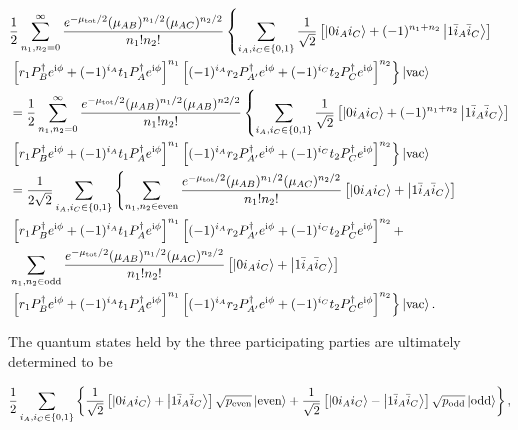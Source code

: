 \documentclass[aps,twocolumn,superscriptaddress,showpacs,nofootinbib]{revtex4-2}
\renewcommand{\i}{\mathrm{i}}
\begin{document}
\begin{widetext}
\begin{equation}
\begin{split}
&\frac{1}{2} \sum_{n_1,n_2=0}^{\infty} \frac{e^{-\mu_\text{tot}/2}(\mu_{AB})^{n_1/2}(\mu_{AC})^{n_2/2}}{n_1!n_2!}
\left\{ \sum_{i_A,i_C \in \{0,1\}} \frac{1}{\sqrt{2}}  \left[ \ket{0 i_A i_C} + (-1)^{n_1+n_2}\ket{1 \bar{i}_A \bar{i}_C} \right] \right.\\
&\left.\left[ r_1 P^\dagger_B e^{\i \phi} + (-1)^{i_A} t_1 P^\dagger_{A} e^{\i \phi} \right]^{n_1}
\left[ (-1)^{i_A} r_2 P^\dagger_{A'} e^{\i \phi} + (-1)^{i_C} t_2 P^\dagger_C e^{\i \phi} \right]^{n_2}  \right\}
\ket{\text{vac}}\\
&= \frac{1}{2} \sum_{n_1,n_2=0}^{\infty} \frac{e^{-\mu_\text{tot}/2}(\mu_{AB})^{n_1/2}(\mu_{AB})^{n2/2}}{n_1!n_2!}
\left\{ \sum_{i_A,i_C \in \{0,1\}} \frac{1}{\sqrt{2}}  \left[ \ket{0 i_A i_C} + (-1)^{n_1+n_2}\ket{1 \bar{i}_A \bar{i}_C} \right] \right.\\
&\left.\left[ r_1 P^\dagger_B e^{\i \phi} + (-1)^{i_A} t_1 P^\dagger_{A} e^{\i \phi} \right]^{n_1}
\left[ (-1)^{i_A} r_2 P^\dagger_{A'} e^{\i \phi} + (-1)^{i_C} t_2 P^\dagger_C e^{\i \phi} \right]^{n_2}  \right\}
\ket{\text{vac}}\\
& = \frac{1}{2\sqrt{2}}\sum_{i_A,i_C\in \{0,1\}}\left\{\sum_{n_1,n_2 \in \text{even}} \frac{e^{-\mu_\text{tot}/2}(\mu_{AB})^{n_1/2}(\mu_{AC})^{n_2/2}}{n_1!n_2!} \left[ \ket{0i_A i_C}+\ket{1\bar{i}_A \bar{i}_C} \right] \right. \\
&\left.\left[ r_1 P^\dagger_B e^{\i \phi} + (-1)^{i_A} t_1 P^\dagger_{A} e^{\i \phi} \right]^{n_1}
\left[ (-1)^{i_A} r_2 P^\dagger_{A'} e^{\i \phi} + (-1)^{i_C} t_2 P^\dagger_C e^{\i \phi} \right]^{n_2} +\right.\\
&
\sum_{n_1,n_2 \in \text{odd}} \frac{e^{-\mu_\text{tot}/2}(\mu_{AB})^{n_1/2}(\mu_{AC})^{n_2/2}}{n_1!n_2!} \left[ \ket{0i_A i_C}+\ket{1\bar{i}_A \bar{i}_C} \right]\\
&\left.\left[ r_1 P^\dagger_B e^{\i \phi} + (-1)^{i_A} t_1 P^\dagger_{A} e^{\i \phi} \right]^{n_1}
\left[ (-1)^{i_A} r_2 P^\dagger_{A'} e^{\i \phi} + (-1)^{i_C} t_2 P^\dagger_C e^{\i \phi} \right]^{n_2}
\right\}
\ket{\text{vac}}.\\
\end{split}
\end{equation}

The quantum states held by the three participating parties are ultimately determined to be

\begin{equation}
\frac{1}{2} \sum_{i_A,i_C \in \{0,1\}} \left\{ \frac{1}{\sqrt{2}} \left[ \ket{0 i_A i_C}
+ \ket{1 \bar{i}_A \bar{i}_C} \right] \sqrt{p_\text{even}} \ket{\text{even}} + \frac{1}{\sqrt{2}} \left[ \ket{0 i_A i_C} - \ket{1 \bar{i}_A \bar{i}_C} \right] \sqrt{p_\text{odd}} \ket{\text{odd}} \right\},
\end{equation}


\end{widetext}
\end{document}
